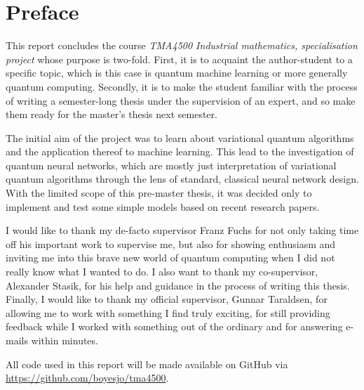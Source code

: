 \section*{Preface}
This report concludes the course \textit{TMA4500 Industrial mathematics, specialisation project} whose purpose is two-fold.
First, it is to acquaint the author-student to a specific topic, which is this case is quantum machine learning or more generally quantum computing.
Secondly, it is to make the student familiar with the process of writing a semester-long thesis under the supervision of an expert, and so make them ready for the master's thesis next semester.

The initial aim of the project was to learn about variational quantum algorithms and the application thereof to machine learning.
This lead to the investigation of quantum neural networks, which are mostly just interpretation of variational quantum algorithms through the lens of standard, classical neural network design.
With the limited scope of this pre-master thesis, it was decided only to implement and test some simple models based on recent research papers.

I would like to thank my de-facto supervisor Franz Fuchs for not only taking time off his important work to supervise me, but also for showing enthusiasm and inviting me into this brave new world of quantum computing when I did not really know what I wanted to do.
I also want to thank my co-supervisor, Alexander Stasik, for his help and guidance in the process of writing this thesis.
Finally, I would like to thank my official supervisor, Gunnar Taraldsen, for allowing me to work with something I find truly exciting, for still providing feedback while I worked with something out of the ordinary and for answering e-mails within minutes.

All code used in this report will be made available on GitHub via \url{https://github.com/boyesjo/tma4500}.



\cleardoublepage